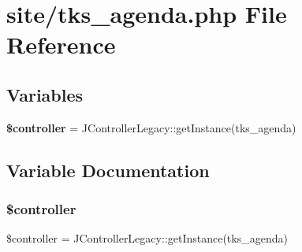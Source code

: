 \section{site/tks\+\_\+agenda.php File Reference}
\label{site_2tks__agenda_8php}
\subsection*{Variables}
\begin{DoxyCompactItemize}
\item 
\textbf{ \$controller} = J\+Controller\+Legacy\+::get\+Instance(\textquotesingle{}tks\+\_\+agenda\textquotesingle{})
\end{DoxyCompactItemize}


\subsection{Variable Documentation}
\mbox{\label{site_2tks__agenda_8php_a388ef7b1db5e6f728e63cee704ce6e23}} 
\subsubsection{\$controller}
{\footnotesize\ttfamily \$controller = J\+Controller\+Legacy\+::get\+Instance(\textquotesingle{}tks\+\_\+agenda\textquotesingle{})}

